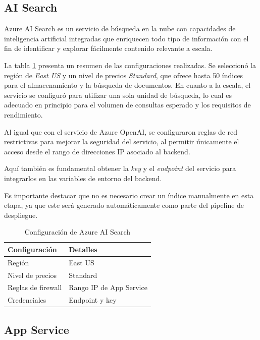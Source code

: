 \subsection{AI Search}

Azure AI Search es un servicio de búsqueda en la nube con capacidades de inteligencia artificial integradas 
que enriquecen todo tipo de información con el fin de identificar y explorar fácilmente contenido relevante a escala.

La tabla \ref{tab:config-ai-search} presenta un resumen de las configuraciones realizadas. Se seleccionó la región de \textit{East US} y un nivel de precios 
\textit{Standard}, que ofrece hasta 50 índices para el almacenamiento y la búsqueda de documentos. En cuanto a la escala, el servicio se configuró para 
utilizar una sola unidad de búsqueda, lo cual es adecuado en principio para el volumen de consultas esperado y los requisitos de rendimiento.

Al igual que con el servicio de Azure OpenAI, se configuraron reglas de red restrictivas para mejorar la seguridad del servicio, al permitir 
únicamente el acceso desde el rango de direcciones IP asociado al backend. 

Aquí también es fundamental obtener la \textit{key} y el \textit{endpoint} del servicio para integrarlos en las variables de entorno del backend.

Es importante destacar que no es necesario crear un índice manualmente en esta etapa, ya que este será generado automáticamente como parte del pipeline de despliegue.

\begin{table}[h]
	\centering
	\caption[Configuración de Azure AI Search]{Configuración de Azure AI Search}
	\begin{tabular}{l l}    
		\toprule
		\textbf{Configuración} 	 & \textbf{Detalles} 	   \\
		\midrule
		Región                   &	East US 			   \\		
		Nivel de precios         & Standard				   \\
		Reglas de firewall       & Rango IP de App Service \\
    	Credenciales	         & Endpoint y key 		   \\
		\bottomrule
		\hline
	\end{tabular}
	\label{tab:config-ai-search}
\end{table}

\subsection{App Service}

